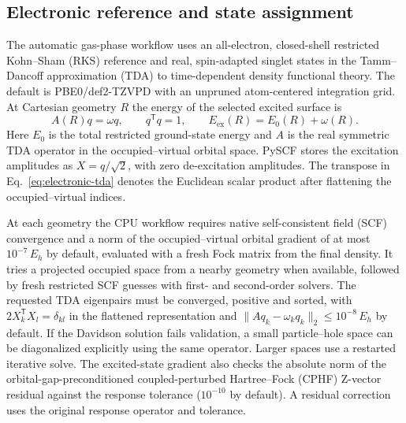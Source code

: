 \subsection{Electronic reference and state assignment}
\label{sec:electronic-reference}

The automatic gas-phase workflow uses an all-electron, closed-shell
restricted Kohn--Sham (RKS) reference and real, spin-adapted singlet states
in the Tamm--Dancoff approximation (TDA) to time-dependent density
functional theory.\cite{pyscf,tda} The default is PBE0/def2-TZVPD with an
unpruned atom-centered integration grid.\cite{pbe0,diffuse} At Cartesian
geometry $R$ the energy of the selected excited surface is
\begin{equation}
 A(R) q = \omega q, \qquad q^{\mathsf T}q=1, \qquad
 E_{\mathrm{ex}}(R)=E_0(R)+\omega(R).
 \label{eq:electronic-tda}
\end{equation}
Here $E_0$ is the total restricted ground-state energy and $A$ is the real
symmetric TDA operator in the occupied--virtual orbital space. PySCF
stores the excitation amplitudes as $X=q/\sqrt{2}$, with zero
de-excitation amplitudes. The transpose in Eq.~\eqref{eq:electronic-tda}
denotes the Euclidean scalar product after flattening the
occupied--virtual indices.

At each geometry the CPU workflow requires native self-consistent field
(SCF) convergence and a norm of the occupied--virtual orbital gradient
of at most $10^{-7}\,E_h$ by default, evaluated with a fresh Fock matrix
from the final density. It tries a projected occupied space from a nearby
geometry when available, followed by fresh restricted SCF guesses with
first- and second-order solvers. The requested TDA eigenpairs must be
converged, positive and sorted, with $2X_k^{\mathsf T}X_l=\delta_{kl}$ in
the flattened representation and $\lVert A q_k-\omega_k q_k\rVert_2\le
10^{-8}\,E_h$ by default. If the Davidson solution fails validation, a
small particle--hole space can be diagonalized explicitly using the same
operator. Larger spaces use a restarted iterative solve. The excited-state
gradient also checks the absolute norm of the orbital-gap-preconditioned
coupled-perturbed Hartree--Fock (CPHF) Z-vector residual against the
response tolerance ($10^{-10}$ by default). A residual correction uses
the original response operator and tolerance.

